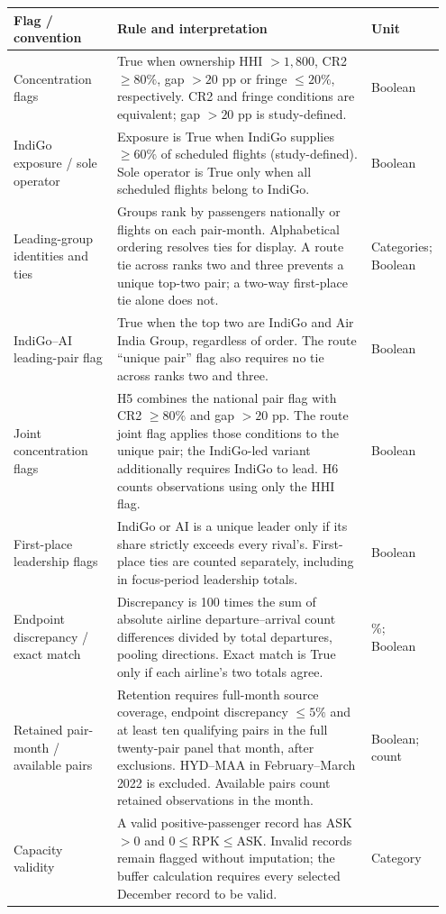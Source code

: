 \begin{tabular}{@{}>{\raggedright\arraybackslash}p{0.24\linewidth}>{\raggedright\arraybackslash}p{0.59\linewidth}>{\raggedright\arraybackslash}p{0.12\linewidth}@{}}
\toprule
Flag / convention & Rule and interpretation & Unit \\
\midrule
Concentration flags & True when ownership HHI $>1{,}800$, CR2 $\geq80\%$, gap $>20$ pp or fringe $\leq20\%$, respectively. CR2 and fringe conditions are equivalent; gap $>20$ pp is study-defined. & Boolean \\
\addlinespace[5pt]
IndiGo exposure / sole operator & Exposure is True when IndiGo supplies $\geq60\%$ of scheduled flights (study-defined). Sole operator is True only when all scheduled flights belong to IndiGo. & Boolean \\
\addlinespace[5pt]
Leading-group identities and ties & Groups rank by passengers nationally or flights on each pair-month. Alphabetical ordering resolves ties for display. A route tie across ranks two and three prevents a unique top-two pair; a two-way first-place tie alone does not. & Categories; Boolean \\
\addlinespace[5pt]
IndiGo--AI leading-pair flag & True when the top two are IndiGo and Air India Group, regardless of order. The route ``unique pair'' flag also requires no tie across ranks two and three. & Boolean \\
\addlinespace[5pt]
Joint concentration flags & H5 combines the national pair flag with CR2 $\geq80\%$ and gap $>20$ pp. The route joint flag applies those conditions to the unique pair; the IndiGo-led variant additionally requires IndiGo to lead. H6 counts observations using only the HHI flag. & Boolean \\
\addlinespace[5pt]
First-place leadership flags & IndiGo or AI is a unique leader only if its share strictly exceeds every rival's. First-place ties are counted separately, including in focus-period leadership totals. & Boolean \\
\addlinespace[5pt]
Endpoint discrepancy / exact match & Discrepancy is 100 times the sum of absolute airline departure--arrival count differences divided by total departures, pooling directions. Exact match is True only if each airline's two totals agree. & \%; Boolean \\
\addlinespace[5pt]
Retained pair-month / available pairs & Retention requires full-month source coverage, endpoint discrepancy $\leq5\%$ and at least ten qualifying pairs in the full twenty-pair panel that month, after exclusions. HYD--MAA in February--March 2022 is excluded. Available pairs count retained observations in the month. & Boolean; count \\
\addlinespace[5pt]
Capacity validity & A valid positive-passenger record has ASK $>0$ and $0\leq\mathrm{RPK}\leq\mathrm{ASK}$. Invalid records remain flagged without imputation; the buffer calculation requires every selected December record to be valid. & Category \\
\bottomrule
\end{tabular}
